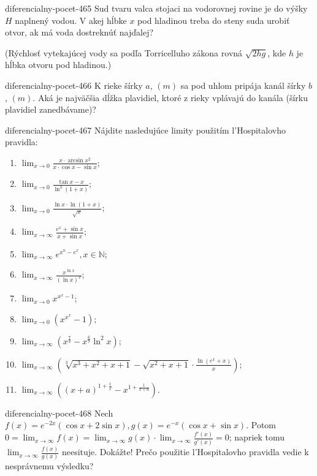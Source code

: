 \begin{defproblem}{diferencialny-pocet-465}
Sud tvaru valca stojaci na vodorovnej rovine je do výšky $H$ naplnený vodou. V akej hĺbke $x$ pod hladinou treba do steny suda urobiť otvor, ak má voda dostreknúť najďalej?

(Rýchlosť vytekajúcej vody sa podľa Torricelluho zákona rovná $\sqrt{2hg}$, kde $h$ je hĺbka otvoru pod hladinou.)
\end{defproblem}

\begin{defproblem}{diferencialny-pocet-466}
K rieke šírky $a$, $(m)$ sa pod uhlom pripája kanál šírky $b$, $(m)$. Aká je najväčšia dĺžka plavidiel, ktoré z rieky vplávajú do kanála (šírku plavidiel zanedbávame)?
\end{defproblem}

\begin{defproblem}{diferencialny-pocet-467}
Nájdite nasledujúce limity použitím l'Hospitalovho pravidla:
\begin{multicols}{2}
\begin{enumerate}
    \item $\lim_{x\rightarrow 0}\frac{x\cdot\arcsin x^2}{x\cdot\cos x -\sin x}$;
	\item $\lim_{x\rightarrow 0}\frac{\tan x -x}{\ln^3 (1+x)}$;
	\item $\lim_{x\rightarrow 0}\frac{\ln x\cdot\ln (1+x)}{\sqrt{x}}$;
	\item $\lim_{x\rightarrow \infty}\frac{e^x+\sin x}{x+\sin x}$;
	\item $\lim_{x\rightarrow \infty}e^{x^n-e^x},x\in\mathbb{N}$;
	\item $\lim_{x\rightarrow \infty}\frac{x^{\ln x}}{(\ln x)^x}$;
	\item $\lim_{x\rightarrow 0}x^{x^x-1}$;
	\item $\lim_{x\rightarrow 0}(x^{x^x}-1)$;
	\item $\lim_{x\rightarrow \infty}(x^{\frac{7}{8}}-x^{\frac{6}{7}}\ln^2 x)$;
	\item $\lim_{x\rightarrow \infty}(\sqrt[3]{x^3+x^2+x+1}-\sqrt{x^2+x+1}\cdot\frac{\ln (e^x+x)}{x})$;
	\item $\lim_{x\rightarrow \infty}((x+a)^{1+\frac{1}{x}}-x^{1+\frac{1}{x+a}})$.
\end{enumerate}
\end{multicols}
\end{defproblem}

\begin{defproblem}{diferencialny-pocet-468}
Nech $f(x)=e^{-2x}(\cos x+2\sin x),g(x)=e^{-x}(\cos x +\sin x)$. Potom $0=\lim_{x\rightarrow\infty}f(x)=\lim_{x\rightarrow\infty}g(x)\cdot\lim_{x\rightarrow\infty}\frac{f'(x)}{g'(x)}=0$; napriek tomu $\lim_{x\rightarrow\infty}\frac{f(x)}{g(x)}$ neesituje. Dokážte! Prečo použitie l'Hospitalovho pravidla vedie k nesprávnemu výsledku?
\end{defproblem}

